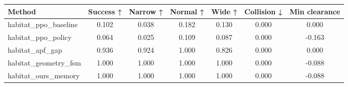 \begin{tabular}{lcccccc}
\toprule
Method & Success ↑ & Narrow ↑ & Normal ↑ & Wide ↑ & Collision ↓ & Min clearance \\
\midrule
habitat_ppo_baseline & 0.102 & 0.038 & 0.182 & 0.130 & 0.000 & 0.000 \\
habitat_ppo_policy & 0.064 & 0.025 & 0.109 & 0.087 & 0.000 & -0.163 \\
habitat_apf_gap & 0.936 & 0.924 & 1.000 & 0.826 & 0.000 & 0.000 \\
habitat_geometry_fsm & 1.000 & 1.000 & 1.000 & 1.000 & 0.000 & -0.088 \\
habitat_ours_memory & 1.000 & 1.000 & 1.000 & 1.000 & 0.000 & -0.088 \\
\bottomrule
\end{tabular}
